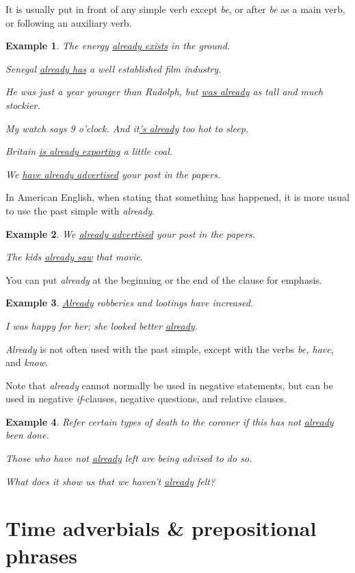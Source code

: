 \documentclass[oneside]{book}
\numberwithin{equation}{section}
\newtheorem{example}{Example}[section]
\begin{document}
It is usually put in front of any simple verb except \textit{be}, or after \textit{be} as a main verb, or following an auxiliary verb.
\begin{example}
    The energy \underline{already exists} in the ground.
    
    Senegal \underline{already has} a well established film industry.
    
    He was just a year younger than Rudolph, but \underline{was already} as tall and much stockier.
    
    My watch says 9 o'clock. And it\underline{'s already} too hot to sleep.
    
    Britain \underline{is already exporting} a little coal.
    
    We \underline{have already advertised} your post in the papers.
\end{example}
In American English, when stating that something has happened, it is more usual to use the past simple with \textit{already}.
\begin{example}
    We \underline{already advertised} your post in the papers.
    
    The kids \underline{already saw} that movie.
\end{example}
You can put \textit{already} at the beginning or the end of the clause for emphasis.
\begin{example}
    \underline{Already} robberies and lootings have increased.
    
    I was happy for her; she looked better \underline{already}.
\end{example}
\textit{Already} is not often used with the past simple, except with the verbs \textit{be, have}, and \textit{know}.

%
Note that \textit{already} cannot normally be used in negative statements, but can be used in negative \textit{if}-clauses, negative questions, and relative clauses.
\begin{example}
    Refer certain types of death to the coroner if this has not \underline{already} been done.
    
    Those who have not \underline{already} left are being advised to do so.
    
    What does it show us that we haven't \underline{already} felt?
\end{example}

\section{Time adverbials \& prepositional phrases}
\end{document}
